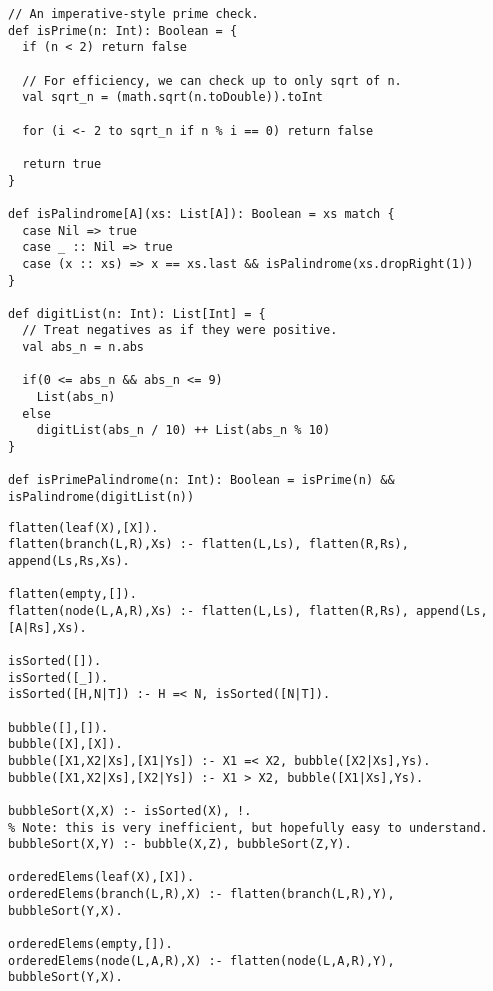 \documentclass[11pt]{article}
\begin{document}
\begin{verbatim}
// An imperative-style prime check.
def isPrime(n: Int): Boolean = {
  if (n < 2) return false

  // For efficiency, we can check up to only sqrt of n.
  val sqrt_n = (math.sqrt(n.toDouble)).toInt
  
  for (i <- 2 to sqrt_n if n % i == 0) return false

  return true
}

def isPalindrome[A](xs: List[A]): Boolean = xs match {
  case Nil => true
  case _ :: Nil => true
  case (x :: xs) => x == xs.last && isPalindrome(xs.dropRight(1))
}

def digitList(n: Int): List[Int] = {
  // Treat negatives as if they were positive.
  val abs_n = n.abs

  if(0 <= abs_n && abs_n <= 9)
    List(abs_n)
  else
    digitList(abs_n / 10) ++ List(abs_n % 10)
}

def isPrimePalindrome(n: Int): Boolean = isPrime(n) && isPalindrome(digitList(n))
\end{verbatim}

\begin{verbatim}
flatten(leaf(X),[X]).
flatten(branch(L,R),Xs) :- flatten(L,Ls), flatten(R,Rs), append(Ls,Rs,Xs).

flatten(empty,[]).
flatten(node(L,A,R),Xs) :- flatten(L,Ls), flatten(R,Rs), append(Ls,[A|Rs],Xs).

isSorted([]).
isSorted([_]).
isSorted([H,N|T]) :- H =< N, isSorted([N|T]).

bubble([],[]).
bubble([X],[X]).
bubble([X1,X2|Xs],[X1|Ys]) :- X1 =< X2, bubble([X2|Xs],Ys).
bubble([X1,X2|Xs],[X2|Ys]) :- X1 > X2, bubble([X1|Xs],Ys).

bubbleSort(X,X) :- isSorted(X), !.
% Note: this is very inefficient, but hopefully easy to understand.
bubbleSort(X,Y) :- bubble(X,Z), bubbleSort(Z,Y).

orderedElems(leaf(X),[X]).
orderedElems(branch(L,R),X) :- flatten(branch(L,R),Y), bubbleSort(Y,X).

orderedElems(empty,[]).
orderedElems(node(L,A,R),X) :- flatten(node(L,A,R),Y), bubbleSort(Y,X).
\end{verbatim}
\end{document}
